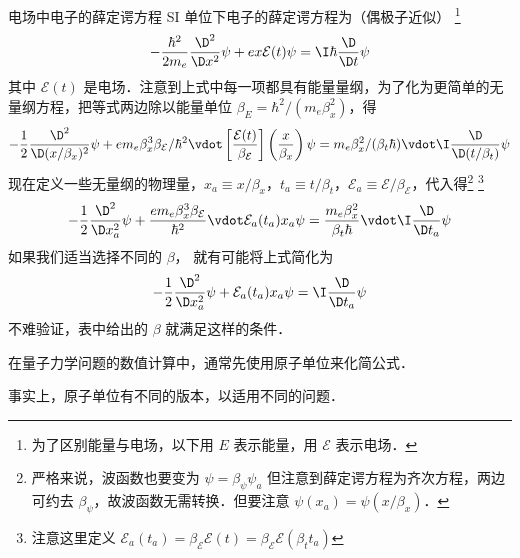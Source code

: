 
\begin{exam}{电场中电子的薛定谔方程} %
SI 单位下电子的薛定谔方程为（偶极子近似） \footnote{为了区别能量与电场，以下用 $E$ 表示能量，用 $\mathcal{E}$ 表示电场．} 
\begin{equation}
-\frac{\hbar^2}{2m_e}\frac{\D^2}{\D x^2}\psi + e x\mathcal{E}(t)\psi= \I\hbar\frac{\D}{\D t}\psi
\end{equation}
其中 $\mathcal{E}(t)$ 是电场．注意到上式中每一项都具有能量量纲，为了化为更简单的无量纲方程，把等式两边除以能量单位 $\beta_E= \hbar^2/(m_e\beta_x^2)$，得
\begin{equation}\label{AU_eq3}
-\frac 12 \frac{\D^2}{\D (x/\beta_x)^2}\psi + e m_e\beta_x^3\beta_\mathcal{E}/\hbar^2 \vdot\left[\frac{\mathcal{E}(t)}{\beta_\mathcal{E}}\right]\left(\frac{x}{\beta_x}\right)\psi= m_e\beta_x^2/(\beta_t\hbar)\vdot\I\frac{\D}{\D (t/\beta_t)}\psi
\end{equation}
现在定义一些无量纲的物理量，$x_a \equiv x/\beta_x$，$t_a \equiv t/\beta_t$，$\mathcal{E}_a \equiv \mathcal{E}/\beta_\mathcal{E}$，代入得\footnote{严格来说，波函数也要变为 $\psi=\beta_\psi\psi_a$ 但注意到薛定谔方程为齐次方程，两边可约去 $\beta_\psi$，故波函数无需转换．但要注意 $\psi(x_a) = \psi(x/\beta_x)$． } \footnote{注意这里定义 $\mathcal{E}_a(t_a)=\beta_\mathcal{E}\mathcal{E}(t)=\beta_\mathcal{E}\mathcal{E}(\beta_t t_a)$}
\begin{equation}\label{AU_eq2}
-\frac 12\frac{\D^2}{\D x_a^2}\psi + \frac{e m_e\beta_x^3\beta_\mathcal{E}}{\hbar^2}\vdot \mathcal{E}_a(t_a) x_a\psi= \frac{m_e\beta_x^2}{\beta_t\hbar}\vdot\I\frac{\D}{\D t_a}\psi
\end{equation}
如果我们适当选择不同的 $\beta$， 就有可能将上式简化为
\begin{equation}\label{AU_eq1}
-\frac 12\frac{\D^2}{\D x_a^2}\psi +\mathcal{E}_a(t_a) x_a\psi= \I\frac{\D}{\D t_a}\psi
\end{equation}
不难验证，表中给出的 $\beta$ 就满足这样的条件．

在量子力学问题的数值计算中，通常先使用原子单位来化简公式．
\end{exam}

事实上，原子单位有不同的版本，以适用不同的问题．

